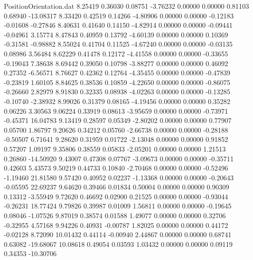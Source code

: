 \begin{filecontents}{PositionOrientation.dat}
   8.25419    0.36030    0.08751    -3.76232    0.00000    0.00000    0.81103    0.68940  -13.08317
   8.33420    0.42519    0.14266    -4.80906    0.00000    0.00000   -0.12183   -0.01608   -0.27846
   8.40631    0.41640    0.14150    -4.82914    0.00000    0.00000   -0.09441   -0.04961    3.15774
   8.47843    0.40959    0.13792    -4.60139    0.00000    0.00000    0.10369   -0.31581   -0.98882
   8.55024    0.41704    0.11525    -4.67240    0.00000    0.00000   -0.03135    0.08986    3.56484
   8.62229    0.41478    0.12172    -4.41558    0.00000    0.00000   -0.33655   -0.19043    7.38638
   8.69442    0.39050    0.10798    -3.88277    0.00000    0.00000    0.46092    0.27352   -6.56571
   8.76627    0.42362    0.12764    -4.35455    0.00000    0.00000   -0.47839   -0.23819    1.60105
   8.84625    0.38536    0.10859    -4.22650    0.00000    0.00000   -0.86075   -0.26660    2.82979
   8.91830    0.32335    0.08938    -4.02263    0.00000    0.00000   -0.13285   -0.10740   -2.38932
   8.99026    0.31379    0.08165    -4.19456    0.00000    0.00000    0.35282    0.06226    3.30563
   9.06224    0.33919    0.08613    -3.95659    0.00000    0.00000   -0.73971   -0.45371   16.04783
   9.13419    0.28597    0.05349    -2.80202    0.00000    0.00000    0.77907    0.05700    1.86797
   9.20626    0.34212    0.05760    -2.66738    0.00000    0.00000   -0.28188   -0.50507    6.71641
   9.28620    0.31959    0.01722    -2.13048    0.00000    0.00000    0.91852    0.57207    1.09197
   9.35806    0.38559    0.05833    -2.05201    0.00000    0.00000    1.21513    0.26860  -14.50920
   9.43007    0.47308    0.07767    -3.09673    0.00000    0.00000   -0.35711    0.42603    5.43573
   9.50219    0.44733    0.10840    -2.70468    0.00000    0.00000   -0.52496   -1.19460   21.81580
   9.57420    0.40952    0.02237    -1.13368    0.00000    0.00000   -0.20643   -0.05595   22.69237
   9.64620    0.39466    0.01834     0.50004    0.00000    0.00000    0.90309    0.13312   -3.55949
   9.72620    0.46692    0.02900     0.21525    0.00000    0.00000   -0.93044   -0.26231   18.77424
   9.79826    0.39987    0.01009     1.56811    0.00000    0.00000   -0.19645    0.08046   -1.07526
   9.87019    0.38574    0.01588     1.49077    0.00000    0.00000    0.32706   -0.32955    4.57168
   9.94226    0.40931   -0.00787     1.82025    0.00000    0.00000    0.44172   -0.02128    8.72090
  10.01432    0.44114   -0.00940     2.44867    0.00000    0.00000    0.68741    0.63082  -19.68067
  10.08618    0.49054    0.03593     1.03432    0.00000    0.00000    0.09119    0.34353  -10.30706

\end{filecontents}
